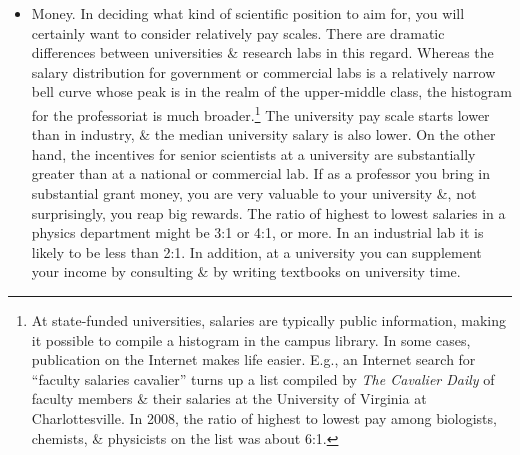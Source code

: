 \documentclass{article}
\begin{document}
\begin{enumerate}
\begin{itemize}
\begin{itemize}
			Apart from problems in dealing with management, 1 of the worst features of scientific life in many industrial \& government labs is a lack of helpers. Whereas a well-funded university professor can enlist an army of students \& postdocs to bring projects to fruition faster, a staff member at a research lab is lucky to have a technician \& an occasional postdoc. (This is much less of a problem in the biotech industry than in companies that perform physical research, according to my sources.) There are opportunities to alleviate such a shortage, e.g., by collaborating with a university research group. However, such opportunities must be aggressively pursued \& are unlikely in unfavorable geographic situations. Scientists who have dreams of attacking a problem from many sides at once will not be able to fulfill them at a government or industrial lab unless they can persuade colleagues to help.
			\item {\sf Money.} In deciding what kind of scientific position to aim for, you will certainly want to consider relatively pay scales. There are dramatic differences between universities \& research labs in this regard. Whereas the salary distribution for government or commercial labs is a relatively narrow bell curve whose peak is in the realm of the upper-middle class, the histogram for the professoriat is much broader.\footnote{At state-funded universities, salaries are typically public information, making it possible to compile a histogram in the campus library. In some cases, publication on the Internet makes life easier. E.g., an Internet search for ``faculty salaries cavalier'' turns up a list compiled by \textit{The Cavalier Daily} of faculty members \& their salaries at the University of Virginia at Charlottesville. In 2008, the ratio of highest to lowest pay among biologists, chemists, \& physicists on the list was about 6:1.} The university pay scale starts lower than in industry, \& the median university salary is also lower. On the other hand, the incentives for senior scientists at a university are substantially greater than at a national or commercial lab. If as a professor you bring in substantial grant money, you are very valuable to your university \&, not surprisingly, you reap big rewards. The ratio of highest to lowest salaries in a physics department might be 3:1 or 4:1, or more. In an industrial lab it is likely to be less than 2:1. In addition, at a university you can supplement your income by consulting \& by writing textbooks on university time.
			

\end{itemize}
\end{itemize}
\end{enumerate}
\end{document}
